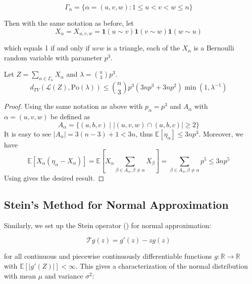 \documentclass{article}
\begin{document}
\begin{equation*}
    \Gamma_{n}=\{\alpha=(u,v,w):1\leq u<v<w\leq n\}
\end{equation*}

Then with the same notation as before, let 
$$
X_{\alpha}=X_{u,v,w} = \mathbf{1}(u\sim v) \mathbf{1}(v\sim w) \mathbf{1}(w\sim u)
$$

which equals 1 if and only if $uvw$ is a triangle, each of the $X_\alpha$ is a Bernoulli random variable with parameter $p^3$. 

\begin{theorem}\label{thm:triangle_poisson_dependent}
    Let $Z = \sum_{\alpha \in \Gamma_n} X_\alpha$ and $\lambda = \binom{n}{3}p^3$.
    \begin{equation*}
        d_{TV}(\mathcal{L}(Z), \text{Po}(\lambda)) \leq \binom{n}{3}p^3(3np^3 + 3np^2) \min (1, \lambda^{-1})
    \end{equation*}
\end{theorem}

\begin{proof}
    Using the same notation as above with $p_\alpha=p^3$ and $A_\alpha$ with $\alpha=(u,v,w)$ be defined as 
    \begin{equation*}
        A_{\alpha} = \{(a,b,c) \mid |(u,v,w)\cap (a,b,c)|\geq 2\}
    \end{equation*}
    It is easy to see $|A_\alpha| = 3(n-3) + 1 < 3n$, thus $\mathbb{E}[\eta_\alpha]\leq 3np^3$. Moreover, we have  
    \begin{equation*}
        \mathbb{E}[X_\alpha(\eta_\alpha - X_\alpha)] = \mathbb{E}[X_\alpha \sum_{\beta \in A_\alpha, \beta \neq \alpha} X_\beta] = \sum_{\beta \in A_\alpha, \beta \neq \alpha} p^5 \leq 3np^5
    \end{equation*}
    Using  gives the desired result.
\end{proof}


\subsection{Stein's Method for Normal Approximation}
Similarly, we set up the Stein operator () for normal approximation:  

\begin{equation}\label{eq:stein_operator_normal}
    \mathcal{T}g(z) = g'(z) - zg(z)
\end{equation}

for all continuous and piecewise continuously differentiable functions $g: \mathbb{R} \to \mathbb{R}$ with $\mathbb{E}[|g'(Z)|]<\infty$. This gives a characterization of the normal distribution with mean $\mu$ and variance $\sigma^2$:  
\end{document}
